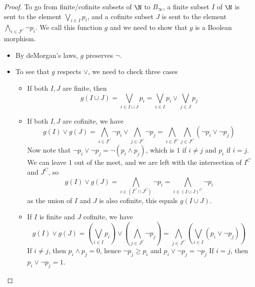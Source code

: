 \begin{proof}
  To go from finite/cofinite subsets of $\N$ to $B_\infty$,
  a finite subset $I$ of $\N$ is sent to the element 
  $\bigvee_{i \in I} p_i$, and a cofinite subset $J$ is sent to the element 
  $\bigwedge_{i \in J^C} \neg p_i$.  
  We call this function $g$ and we need to show that $g$ is a Boolean morphism. 
  \begin{itemize}
    \item By deMorgan's laws, $g$ preserves $\neg$. 
    \item To see that $g$ respects $\vee$, we need to check three cases
      \begin{itemize}
        \item If both $I,J$ are finite, then 
        \begin{equation} 
          g(I \cup J) = \bigvee_{i\in I \cup J} p_i= \bigvee_{i\in I} p_i \vee \bigvee_{j\in J} p_j 
        \end{equation}
      \item If both $I,J$ are cofinite, we have
        \begin{equation}
          g(I) \vee g(J) = 
          \bigwedge_{i \in I^C} \neg p_i \vee 
          \bigwedge_{j \in J^C} \neg p_j 
          = 
          \bigwedge_{i\in I^C} 
          \bigwedge_{j \in J^C}(\neg p_i \vee  \neg p_j) 
        \end{equation}
        Now note that $\neg p_i \vee \neg p_j = \neg ( p_i \wedge p_j)$, which 
        is $1$ if $i \neq j$ and $p_i$ if $i =j$. 
        We can leave $1$ out of the meet, and we are left with the intersection of $I^C$ and $J^C$, so
        \begin{equation}
          g(I) \vee g(J) = 
          \bigwedge_{i \in (I^C \cap J^C)} \neg p_i
          = 
          \bigwedge_{i \in (I \cup J)^C} \neg p_i 
        \end{equation} 
        as the union of $I$ and $J$ is also cofinite, this equals 
          $ g( I \cup J)$. 
        \item If $I$ is finite and $J$ cofinite, we have 
        \begin{equation}
        g(I) \vee g(J) = (\bigvee_{i\in I} p_i) \vee (\bigwedge_{j \in J^C} \neg p_j)
        = \bigwedge_{j \in J^C} (\bigvee_{i \in I}( p_i \vee \neg p_j))
        \end{equation}
        If $i\neq j$, then $p_i\wedge p_j = 0$, hence $\neg p_j \geq p_i$ and $p_i \vee \neg p_j  = \neg p_j$
        If $i = j$, then $p_i \vee \neg p_j = 1$.

\end{itemize}
\end{itemize}
\end{proof}
